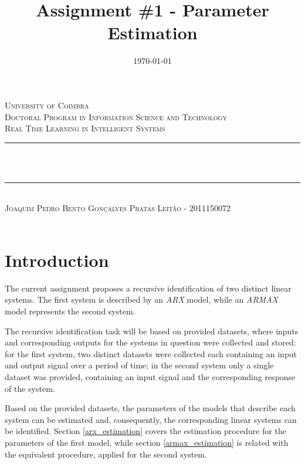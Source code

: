 \documentclass[12pt]{article}
\title{Assignment \#1 - Parameter Estimation}
\date{\today}
\makeatletter
\let\thetitle\@title
\let\thedate\@date
\makeatother
\begin{document}

\begin{titlepage}
	\centering
    \textsc{\LARGE University of Coimbra}\\[1.0 cm]
	\textsc{\large Doctoral Program in Information Science and Technology}\\[0.5 cm]
    \textsc{\large Real Time Learning in Intelligent Systems}\\[5 cm]
	\rule{\linewidth}{0.2 mm} \\[0.4 cm]
	{ \LARGE \bfseries \thetitle}\\ [0.2 cm]
    \rule{\linewidth}{0.2 mm} \\[3 cm]
    
    \textsc{Joaquim Pedro Bento Gonçalves Pratas Leitão - 2011150072}\\[5 cm]
	
	{\large \thedate}\\[2 cm]
 
	\vfill
	
\end{titlepage}


\section{Introduction}
\label{introduction}

The current assignment proposes a recursive identification of two distinct linear systems. The first system is described by an \emph{ARX} model, while an \emph{ARMAX} model represents the second system.

The recursive identification task will be based on provided datasets, where inputs and corresponding outputs for the systems in question were collected and stored: for the first system, two distinct datasets were collected each containing an input and output signal over a period of time; in the second system only a single dataset was provided, containing an input signal and the corresponding response of the system.

Based on the provided datasets, the parameters of the models that describe each system can be estimated and, consequently, the corresponding linear systems can be identified. Section \ref{arx_estimation} covers the estimation procedure for the parameters of the first model, while section \ref{armax_estimation} is related with the equivalent procedure, applied for the second system.
\end{document}
